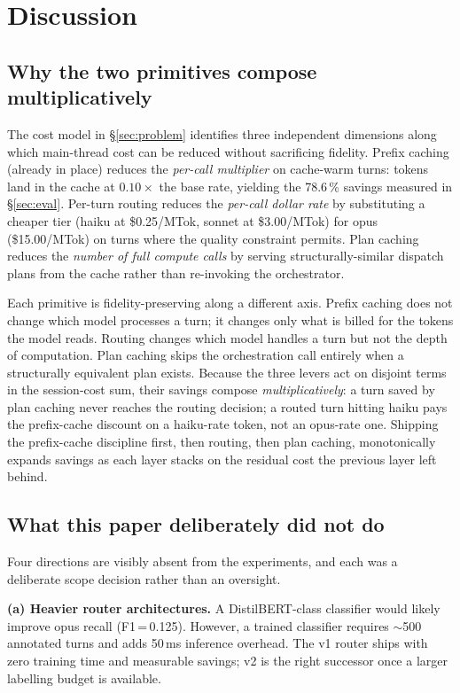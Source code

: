 \section{Discussion}
\label{sec:discussion}

\subsection{Why the two primitives compose multiplicatively}

The cost model in §\ref{sec:problem} identifies three independent dimensions along which main-thread cost can be reduced without sacrificing fidelity. Prefix caching (already in place) reduces the \emph{per-call multiplier} on cache-warm turns: tokens land in the cache at \(0.10\times\) the base rate, yielding the 78.6\,\% savings measured in §\ref{sec:eval}. Per-turn routing reduces the \emph{per-call dollar rate} by substituting a cheaper tier (haiku at \$0.25/MTok, sonnet at \$3.00/MTok) for opus (\$15.00/MTok) on turns where the quality constraint permits. Plan caching reduces the \emph{number of full compute calls} by serving structurally-similar dispatch plans from the cache rather than re-invoking the orchestrator.

Each primitive is fidelity-preserving along a different axis. Prefix caching does not change which model processes a turn; it changes only what is billed for the tokens the model reads. Routing changes which model handles a turn but not the depth of computation. Plan caching skips the orchestration call entirely when a structurally equivalent plan exists. Because the three levers act on disjoint terms in the session-cost sum, their savings compose \emph{multiplicatively}: a turn saved by plan caching never reaches the routing decision; a routed turn hitting haiku pays the prefix-cache discount on a haiku-rate token, not an opus-rate one. Shipping the prefix-cache discipline first, then routing, then plan caching, monotonically expands savings as each layer stacks on the residual cost the previous layer left behind.

\subsection{What this paper deliberately did not do}

Four directions are visibly absent from the experiments, and each was a deliberate scope decision rather than an oversight.

\textbf{(a) Heavier router architectures.} A DistilBERT-class classifier would likely improve opus recall (F1\,=\,0.125). However, a trained classifier requires \(\sim\)500 annotated turns and adds 50\,ms inference overhead. The v1 router ships with zero training time and measurable savings; v2 is the right successor once a larger labelling budget is available.

